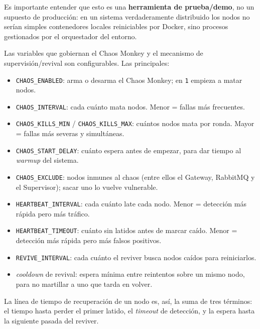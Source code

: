 \documentclass[12pt,a4paper]{article}
\begin{document}
Es importante entender que esto es una \textbf{herramienta de prueba/demo}, no
un supuesto de producción: en un sistema verdaderamente distribuido los nodos
no serían simples contenedores locales reiniciables por Docker, sino procesos
gestionados por el orquestador del entorno.

Las variables que gobiernan el Chaos Monkey y el mecanismo de
supervisión/revival son configurables. Las principales:
\begin{itemize}
    \item \texttt{CHAOS\_ENABLED}: arma o desarma el Chaos Monkey;
        en \texttt{1} empieza a matar nodos.
    \item \texttt{CHAOS\_INTERVAL}: cada cuánto mata nodos. Menor =
        fallas más frecuentes.
    \item \texttt{CHAOS\_KILLS\_MIN} / \texttt{CHAOS\_KILLS\_MAX}: cuántos nodos
        mata por ronda. Mayor = fallas
        más severas y simultáneas.
    \item \texttt{CHAOS\_START\_DELAY}: cuánto espera antes de
        empezar, para dar tiempo al \textit{warmup} del sistema.
    \item \texttt{CHAOS\_EXCLUDE}: nodos inmunes al chaos (entre
            ellos el Gateway,
        RabbitMQ y el Supervisor); sacar uno lo vuelve vulnerable.
    \item \texttt{HEARTBEAT\_INTERVAL}: cada cuánto late cada
        nodo. Menor = detección más rápida pero más tráfico.
    \item \texttt{HEARTBEAT\_TIMEOUT}: cuánto sin latidos antes
        de marcar caído. Menor = detección más rápida pero más falsos positivos.
    \item \texttt{REVIVE\_INTERVAL}: cada cuánto el reviver busca
        nodos caídos para reiniciarlos.
    \item \textit{cooldown} de revival: espera mínima entre
        reintentos sobre un mismo nodo, para no martillar a uno que tarda en
        volver.
\end{itemize}
La línea de tiempo de recuperación de un nodo es, así, la suma de tres
términos: el tiempo hasta perder el primer latido, el \textit{timeout} de
detección, y la espera hasta la siguiente pasada del reviver.
\end{document}
